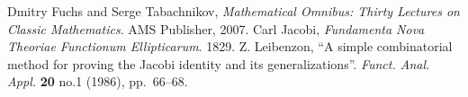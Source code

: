\documentclass{article}
\begin{document}



\begin{thebibliography}{99}
  Dmitry Fuchs and Serge Tabachnikov,
  \emph{Mathematical Omnibus: Thirty Lectures on Classic Mathematics}.
  AMS Publisher, 2007.
  Carl Jacobi,
  \emph{Fundamenta Nova Theoriae Functionum Ellipticarum}.
  1829.
  Z. Leibenzon,
  ``A simple combinatorial method for proving the Jacobi identity and its generalizations''.
  \emph{Funct. Anal. Appl.} \textbf{20} no.1 (1986), pp.~66--68.
\end{thebibliography}
\end{document}
